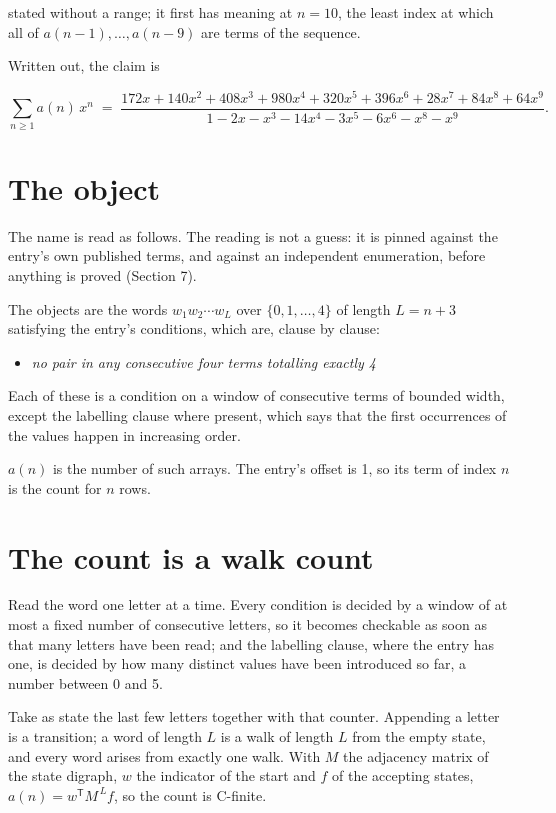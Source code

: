 \documentclass[11pt]{article}
\theoremstyle{definition}
\begin{document}
stated without a range; it first has meaning at $n = 10$, the least index at which all of $a(n-1),\dots,a(n-9)$ are terms of the sequence.

Written out, the claim is

\[\sum_{n \ge 1} a(n)\,x^n \;=\; \frac{172x + 140x^{2} + 408x^{3} + 980x^{4} + 320x^{5} + 396x^{6} + 28x^{7} + 84x^{8} + 64x^{9}}{1 - 2x - x^{3} - 14x^{4} - 3x^{5} - 6x^{6} - x^{8} - x^{9}}.\]

\section{The object}

The name is read as follows. The reading is not a guess: it is pinned against the entry's own published terms, and against an independent enumeration, before anything is proved (Section 7).

The objects are the words $w_1 w_2 \cdots w_L$ over $\{0,1,\dots,4\}$ of length $L = n + 3$ satisfying the entry's conditions, which are, clause by clause:

\begin{itemize}

\item {\itshape no pair in any consecutive four terms totalling exactly 4}

\end{itemize}

Each of these is a condition on a window of consecutive terms of bounded width, except the labelling clause where present, which says that the first occurrences of the values happen in increasing order.

$a(n)$ is the number of such arrays. The entry's offset is 1, so its term of index $n$ is the count for $n$ rows.

\section{The count is a walk count}

Read the word one letter at a time. Every condition is decided by a window of at most a fixed number of consecutive letters, so it becomes checkable as soon as that many letters have been read; and the labelling clause, where the entry has one, is decided by how many distinct values have been introduced so far, a number between $0$ and 5.

Take as state the last few letters together with that counter. Appending a letter is a transition; a word of length $L$ is a walk of length $L$ from the empty state, and every word arises from exactly one walk. With $M$ the adjacency matrix of the state digraph, $w$ the indicator of the start and $f$ of the accepting states, $a(n) = w^{\mathsf T}M^{\,L}f$, so the count is C-finite.
\end{document}
